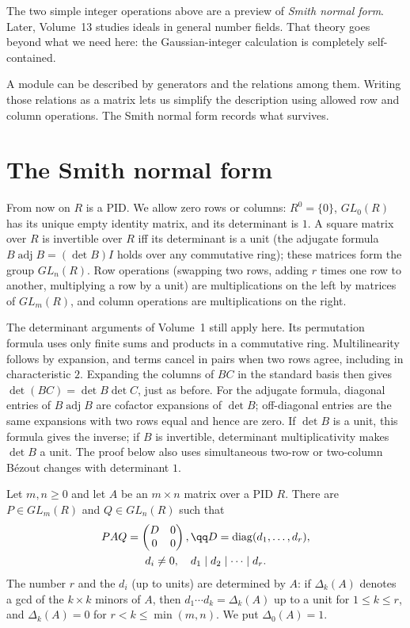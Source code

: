 The two simple integer operations above are a preview of
\emph{Smith normal form}. Later, Volume~13 studies ideals in general
number fields. That theory goes beyond what we need here:
the Gaussian-integer calculation is completely self-contained.


A module can be described by generators and the relations among them. Writing those relations as a matrix lets us simplify the description using allowed row and column operations. The Smith normal form records what survives.

\section{The Smith normal form}\label{sec:smith}

From now on $R$ is a PID. We allow zero rows or columns: $R^0=\{0\}$, $GL_0(R)$ has its unique empty identity matrix, and its determinant is $1$. A square matrix over $R$ is invertible over $R$ iff its determinant is a unit (the adjugate formula $B\operatorname{adj}B=(\det B)I$ holds over any commutative ring); these matrices form the group $GL_n(R)$. Row operations (swapping two rows, adding $r$ times one row to another, multiplying a row by a unit) are multiplications on the left by matrices of $GL_m(R)$, and column operations are multiplications on the right.

The determinant arguments of Volume~1 still apply here. Its permutation
formula uses only finite sums and products in a commutative ring.
Multilinearity follows by expansion, and terms cancel in pairs when
two rows agree, including in characteristic $2$. Expanding the columns
of $BC$ in the standard basis then gives
$\det(BC)=\det B\det C$, just as before. For the adjugate formula,
diagonal entries of $B\operatorname{adj}B$ are cofactor expansions of
$\det B$; off-diagonal entries are the same expansions with two rows
equal and hence are zero. If $\det B$ is a unit, this formula gives
the inverse; if $B$ is invertible, determinant multiplicativity makes
$\det B$ a unit. The proof below also uses simultaneous two-row or
two-column Bézout changes with determinant $1$.

\begin{theorem}\label{thm:smith}
Let $m,n\ge0$ and let $A$ be an $m\times n$ matrix over a PID $R$. There are $P\in GL_m(R)$ and $Q\in GL_n(R)$ such that
\[
\begin{gathered}PAQ=\begin{pmatrix}D&0\\0&0\end{pmatrix},\qq D=\operatorname{diag}(d_1,\dots,d_r),\\ d_i\ne0,\quad d_1\mid d_2\mid\dots\mid d_r.\end{gathered}
\]
The number $r$ and the $d_i$ (up to units) are determined by $A$: if $\Delta_k(A)$ denotes a gcd of the $k\times k$ minors of $A$, then $d_1\cdots d_k=\Delta_k(A)$ up to a unit for $1\le k\le r$, and $\Delta_k(A)=0$ for $r<k\le\min(m,n)$. We put $\Delta_0(A)=1$.
\end{theorem}

